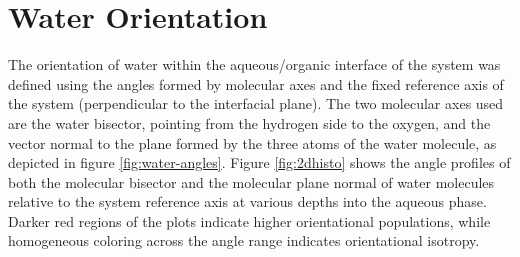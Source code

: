 \section{Water Orientation}
The orientation of water within the aqueous/organic interface of the system was defined using the angles formed by molecular axes and the fixed reference axis of the system (perpendicular to the interfacial plane). The two molecular axes used are the water bisector, pointing from the hydrogen side to the oxygen, and the vector normal to the plane formed by the three atoms of the water molecule, as depicted in figure \ref{fig:water-angles}. Figure \ref{fig:2dhisto} shows the angle profiles of both the molecular bisector and the molecular plane normal of water molecules relative to the system reference axis at various depths into the aqueous phase. Darker red regions of the plots indicate higher orientational populations, while homogeneous coloring across the angle range indicates orientational isotropy.


